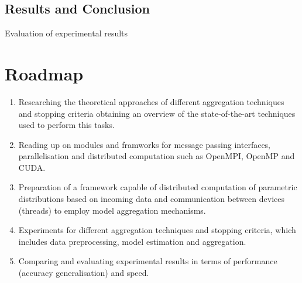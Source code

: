     \subsection{Results and Conclusion}
    Evaluation of experimental results 
    \section{Roadmap}
    \begin{enumerate}
       \item Researching the theoretical approaches of different aggregation techniques and stopping criteria obtaining an overview of the state-of-the-art techniques used to perform this tasks.
       \item Reading up on modules and framworks for message passing interfaces, parallelisation and distributed computation such as OpenMPI, OpenMP and CUDA.
       \item Preparation of a framework capable of distributed computation of parametric distributions based on incoming data and communication between devices (threads) to employ model aggregation mechanisms.
       \item Experiments for different aggregation techniques and stopping criteria, which includes data preprocessing, model estimation and aggregation.
       \item Comparing and evaluating experimental results in terms of performance (accuracy generalisation) and speed.
    \end{enumerate}